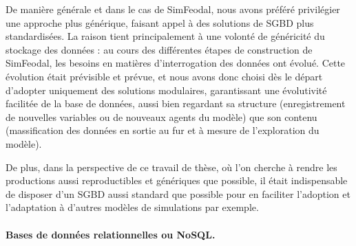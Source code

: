 De manière générale et dans le cas de SimFeodal, nous avons préféré privilégier une approche plus générique, faisant appel à des solutions de SGBD plus standardisées.
La raison tient principalement à une volonté de généricité du stockage des données : au cours des différentes étapes de construction de SimFeodal, les besoins en matières d'interrogation des données ont évolué.
Cette évolution était prévisible et prévue, et nous avons donc choisi dès le départ d'adopter uniquement des solutions modulaires, garantissant une évolutivité facilitée de la base de données, aussi bien regardant sa structure (enregistrement de nouvelles variables ou de nouveaux agents du modèle) que son contenu (massification des données en sortie au fur et à mesure de l'exploration du modèle).

De plus, dans la perspective de ce travail de thèse, où l'on cherche à rendre les productions aussi reproductibles et génériques que possible, il était indispensable de disposer d'un SGBD aussi standard que possible pour en faciliter l'adoption et l'adaptation à d'autres modèles de simulations par exemple.

\paragraph{Bases de données relationnelles ou NoSQL.}\label{par:sql-nosql}

